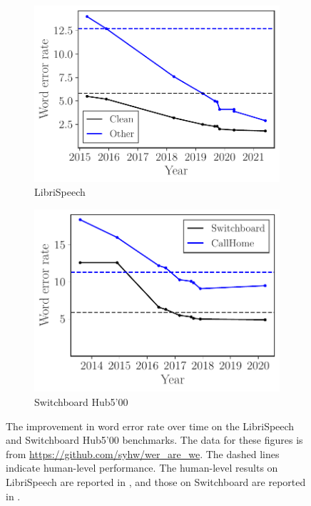 \begin{figure}[ht!]
    \centering
    \begin{subfigure}[b]{0.48\textwidth}
    \centering
    \includegraphics[width=\linewidth]{figures/librispeech_wer}
    \caption{LibriSpeech}
    \end{subfigure}
    \hfill
    \begin{subfigure}[b]{0.48\textwidth}
    \centering
    \includegraphics[width=\linewidth]{figures/switchboard_wer}
    \caption{Switchboard Hub5'00}
    \end{subfigure}
    \caption{The improvement in word error rate over time on the
    LibriSpeech~\citep{panayotov2015librispeech} and Switchboard Hub5'00
    benchmarks. The data for these figures is from
    \url{https://github.com/syhw/wer_are_we}. The dashed lines indicate
    human-level performance. The human-level results on LibriSpeech are
    reported in \citet{amodei2016deep}, and those on Switchboard are reported in
    \citet{xiong2016achieving}.}
    \label{fig:wers}
\end{figure}

